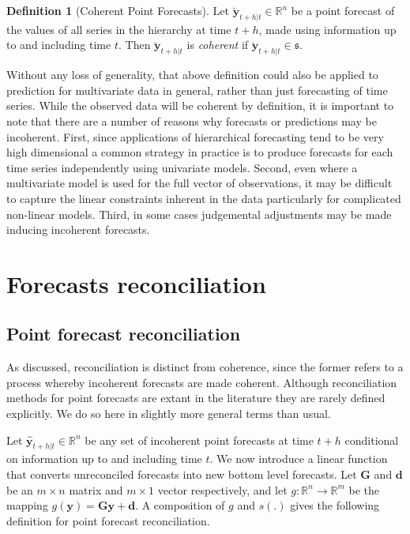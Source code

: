 \documentclass[12pt]{article}
\theoremstyle{definition}
\newtheorem{definition}{Definition}[section]
\begin{document}
	\begin{definition}[Coherent Point Forecasts]\label{def:cohpoint}
		Let $\breve{\bm{y}}_{t+h|t} \in \mathbb{R}^n$ be a point forecast of the values of all series in the hierarchy at time $t+h$, made using information up to and including time $t$. Then $\breve{\bm{y}}_{t+h|t}$ is \emph{coherent} if $\breve{\bm{y}}_{t+h|t} \in \mathfrak{s}$.
	\end{definition}

    Without any loss of generality, that above definition could also be applied to prediction for multivariate data in general, rather than just forecasting of time series.  While the observed data will be coherent by definition, it is important to note that there are a number of reasons why forecasts or predictions may be incoherent.  First, since applications of hierarchical forecasting tend to be very high dimensional a common strategy in practice is to produce forecasts for each time series independently using univariate models.  Second, even where a multivariate model is used for the full vector of observations, it may be difficult to capture the linear constraints inherent in the data particularly for complicated non-linear models.  Third, in some cases judgemental adjustments may be made inducing incoherent forecasts. 
	
	
	
\section{Forecasts reconciliation}\label{sec:Reconciliation}
	
	\subsection{Point forecast reconciliation}\label{sec:reconciliation}
	
	As discussed, reconciliation is distinct from coherence, since the former refers to a process whereby incoherent forecasts are made coherent. Although reconciliation methods for point forecasts are extant in the literature they are rarely defined explicitly.  We do so here in slightly more general terms than usual. 
	
	Let $\hat{\bm{y}}_{t+h|t} \in \mathbb{R}^n$ be any set of incoherent point forecasts at time $t+h$ conditional on information up to and including time $t$. We now introduce a linear function that converts unreconciled forecasts into new bottom level forecasts.
	Let $\bm{G}$ and $\bm{d}$ be an $m\times n$ matrix and $m\times 1$ vector respectively, and let $g:\mathbb{R}^n \rightarrow \mathbb{R}^m$ be the mapping $g(\bm{y})=\bm{G}\bm{y}+\bm{d}$.  A composition of $g$ and $s(.)$ gives the following definition for point forecast reconciliation.
	
\end{document}
